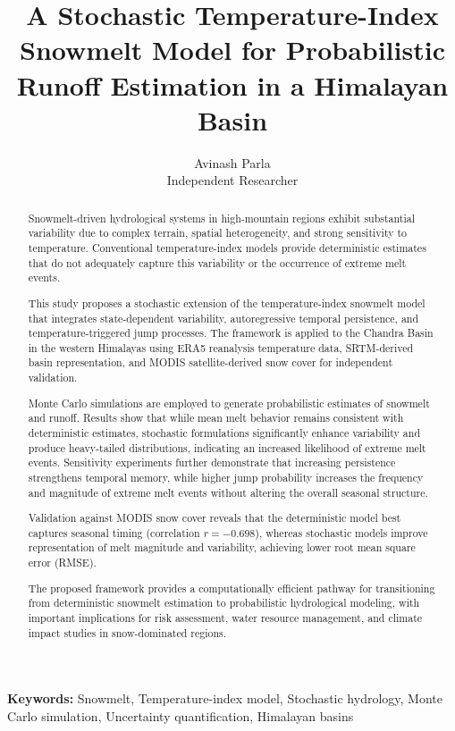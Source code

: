 \documentclass[11pt]{article}
\title{A Stochastic Temperature-Index Snowmelt Model for Probabilistic Runoff Estimation in a Himalayan Basin}
\author{Avinash Parla \\ Independent Researcher}
\date{}
\begin{document}
	
	\maketitle
	
\begin{abstract}
	Snowmelt-driven hydrological systems in high-mountain regions exhibit substantial variability due to complex terrain, spatial heterogeneity, and strong sensitivity to temperature. Conventional temperature-index models provide deterministic estimates that do not adequately capture this variability or the occurrence of extreme melt events.
	
	This study proposes a stochastic extension of the temperature-index snowmelt model that integrates state-dependent variability, autoregressive temporal persistence, and temperature-triggered jump processes. The framework is applied to the Chandra Basin in the western Himalayas using ERA5 reanalysis temperature data, SRTM-derived basin representation, and MODIS satellite-derived snow cover for independent validation.
	
	Monte Carlo simulations are employed to generate probabilistic estimates of snowmelt and runoff. Results show that while mean melt behavior remains consistent with deterministic estimates, stochastic formulations significantly enhance variability and produce heavy-tailed distributions, indicating an increased likelihood of extreme melt events. Sensitivity experiments further demonstrate that increasing persistence strengthens temporal memory, while higher jump probability increases the frequency and magnitude of extreme melt events without altering the overall seasonal structure.
	
	Validation against MODIS snow cover reveals that the deterministic model best captures seasonal timing (correlation $r = -0.698$), whereas stochastic models improve representation of melt magnitude and variability, achieving lower root mean square error (RMSE).
	
	The proposed framework provides a computationally efficient pathway for transitioning from deterministic snowmelt estimation to probabilistic hydrological modeling, with important implications for risk assessment, water resource management, and climate impact studies in snow-dominated regions.
\end{abstract}

\textbf{Keywords:} Snowmelt, Temperature-index model, Stochastic hydrology, Monte Carlo simulation, Uncertainty quantification, Himalayan basins
\end{document}
